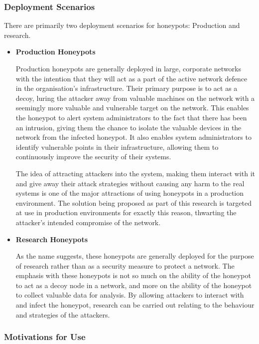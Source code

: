 \subsubsection{Deployment Scenarios}
There are primarily two deployment scenarios for honeypots: Production and research.

\begin{itemize}
	\item \textbf{Production Honeypots}
	
	Production honeypots are generally deployed in large, corporate networks with the intention that they will act as a part of the active network defence in the organisation’s infrastructure. Their primary purpose is to act as a decoy, luring the attacker away from valuable machines on the network with a seemingly more valuable and vulnerable target on the network. This enables the honeypot to alert system administrators to the fact that there has been an intrusion, giving them the chance to isolate the valuable devices in the network from the infected honeypot. It also enables system administrators to identify vulnerable points in their infrastructure, allowing them to continuously improve the security of their systems. 
	
	The idea of attracting attackers into the system, making them interact with it and give away their attack strategies without causing any harm to the real systems is one of the major attractions of using honeypots in a production environment. The solution being proposed as part of this research is targeted at use in production environments for exactly this reason, thwarting the attacker’s intended compromise of the network.
	
	
	\item \textbf{Research Honeypots}
	
	As the name suggests, these honeypots are generally deployed for the purpose of research rather than as a security measure to protect a network. The emphasis with these honeypots is not so much on the ability of the honeypot to act as a decoy node in a network, and more on the ability of the honeypot to collect valuable data for analysis. By allowing attackers to interact with and infect the honeypot, research can be carried out relating to the behaviour and strategies of the attackers.
	
\end{itemize}


\subsubsection{Motivations for Use}

